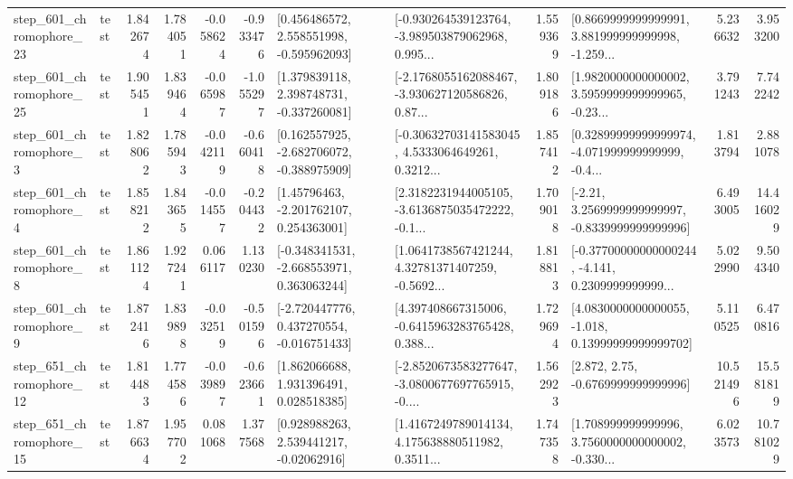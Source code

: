 \begin{tabular}{llrrrrllrlrr}
  step\_601\_chromophore\_23 &      test &      1.842674 &    1.784051 &     -0.058624 & -0.933476 &    [0.456486572, 2.558551998, -0.595962093] &  [-0.930264539123764, -3.989503879062968, 0.995... &       1.559369 &  [0.8669999999999991, 3.881999999999998, -1.259... &            5.236632 &          3.953200 \\
  step\_601\_chromophore\_25 &      test &      1.905451 &    1.839464 &     -0.065987 & -1.055297 &    [1.379839118, 2.398748731, -0.337260081] &  [-2.1768055162088467, -3.930627120586826, 0.87... &       1.809186 &  [1.9820000000000002, 3.5959999999999965, -0.23... &            3.791243 &          7.742242 \\
   step\_601\_chromophore\_3 &      test &      1.828062 &    1.785943 &     -0.042119 & -0.660418 &   [0.162557925, -2.682706072, -0.388975909] &  [-0.30632703141583045, 4.5333064649261, 0.3212... &       1.857412 &  [0.32899999999999974, -4.071999999999999, -0.4... &            1.813794 &          2.881078 \\
   step\_601\_chromophore\_4 &      test &      1.858212 &    1.843655 &     -0.014557 & -0.204432 &     [1.45796463, -2.201762107, 0.254363001] &  [2.3182231944005105, -3.6136875035472222, -0.1... &       1.709018 &   [-2.21, 3.2569999999999997, -0.8339999999999996] &            6.493005 &         14.416029 \\
   step\_601\_chromophore\_8 &      test &      1.861124 &    1.927241 &      0.066117 &  1.130230 &   [-0.348341531, -2.668553971, 0.363063244] &  [1.0641738567421244, 4.32781371407259, -0.5692... &       1.818813 &  [-0.37700000000000244, -4.141, 0.2309999999999... &            5.022990 &          9.504340 \\
   step\_601\_chromophore\_9 &      test &      1.872416 &    1.839898 &     -0.032519 & -0.501596 &   [-2.720447776, 0.437270554, -0.016751433] &  [4.397408667315006, -0.6415963283765428, 0.388... &       1.729694 &  [4.0830000000000055, -1.018, 0.13999999999999702] &            5.110525 &          6.470816 \\
  step\_651\_chromophore\_12 &      test &      1.814483 &    1.774586 &     -0.039897 & -0.623661 &     [1.862066688, 1.931396491, 0.028518385] &  [-2.8520673583277647, -3.0800677697765915, -0.... &       1.562923 &                 [2.872, 2.75, -0.6769999999999996] &           10.521496 &         15.581819 \\
  step\_651\_chromophore\_15 &      test &      1.876634 &    1.957702 &      0.081068 &  1.377568 &     [0.928988263, 2.539441217, -0.02062916] &  [1.4167249789014134, 4.175638880511982, 0.3511... &       1.747358 &  [1.708999999999996, 3.7560000000000002, -0.330... &            6.023573 &         10.781029 \\

\end{tabular}
